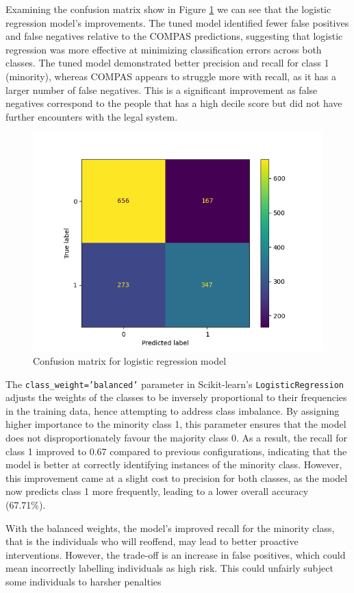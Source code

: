 Examining the confusion matrix show in Figure \ref{fig:logisticregressioncm} we can see that the logistic regression model's improvements. The tuned model identified fewer false positives and false negatives relative to the COMPAS predictions, suggesting that logistic regression was more effective at minimizing classification errors across both classes. The tuned model demonstrated better precision and recall for class 1 (minority), whereas COMPAS appears to struggle more with recall, as it has a larger number of false negatives. This is a significant improvement as false negatives correspond to the people that has a high decile score but did not have further encounters with the legal system.

\begin{figure}[H]
	\centering
	\includegraphics[width=0.7\linewidth]{img/logistic_regression_cm}
	\caption{Confusion matrix for logistic regression model}
	\label{fig:logisticregressioncm}
\end{figure}


The \texttt{class\_weight='balanced'} parameter in Scikit-learn's \texttt{LogisticRegression} adjusts the weights of the classes to be inversely proportional to their frequencies in the training data, hence attempting to address class imbalance. By assigning higher importance to the minority class 1, this parameter ensures that the model does not disproportionately favour the majority class 0. As a result, the recall for class 1 improved to 0.67 compared to previous configurations, indicating that the model is better at correctly identifying instances of the minority class. However, this improvement came at a slight cost to precision for both classes, as the model now predicts class 1 more frequently, leading to a lower overall accuracy (67.71\%). 

With the balanced weights, the model's improved recall for the minority class, that is the individuals who will reoffend, may lead to better proactive interventions. However, the trade-off is an increase in false positives, which could mean incorrectly labelling individuals as high risk. This could unfairly subject some individuals to harsher penalties

